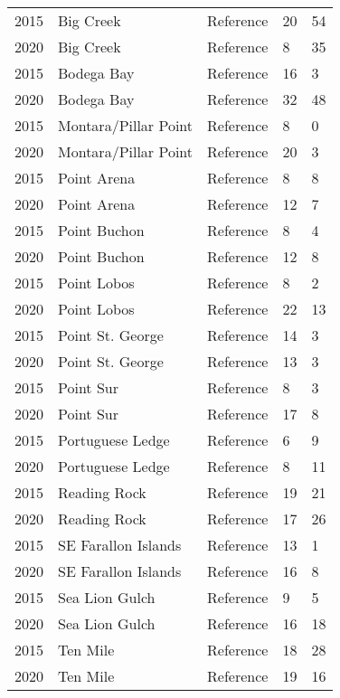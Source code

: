 \documentclass[11pt,
  english,
  letterpaper,
]{article}
\begin{document}
\begin{longtable}[t]{l>{\raggedright\arraybackslash}p{3cm}lll}
2015 & Big Creek & Reference & 20 & 54\\
2020 & Big Creek & Reference & 8 & 35\\
2015 & Bodega Bay & Reference & 16 & 3\\
2020 & Bodega Bay & Reference & 32 & 48\\
2015 & Montara/Pillar Point & Reference & 8 & 0\\
2020 & Montara/Pillar Point & Reference & 20 & 3\\
2015 & Point Arena & Reference & 8 & 8\\
2020 & Point Arena & Reference & 12 & 7\\
2015 & Point Buchon & Reference & 8 & 4\\
2020 & Point Buchon & Reference & 12 & 8\\
2015 & Point Lobos & Reference & 8 & 2\\
2020 & Point Lobos & Reference & 22 & 13\\
2015 & Point St. George & Reference & 14 & 3\\
2020 & Point St. George & Reference & 13 & 3\\
2015 & Point Sur & Reference & 8 & 3\\
2020 & Point Sur & Reference & 17 & 8\\
2015 & Portuguese Ledge & Reference & 6 & 9\\
2020 & Portuguese Ledge & Reference & 8 & 11\\
2015 & Reading Rock & Reference & 19 & 21\\
2020 & Reading Rock & Reference & 17 & 26\\
2015 & SE Farallon Islands & Reference & 13 & 1\\
2020 & SE Farallon Islands & Reference & 16 & 8\\
2015 & Sea Lion Gulch & Reference & 9 & 5\\
2020 & Sea Lion Gulch & Reference & 16 & 18\\
2015 & Ten Mile & Reference & 18 & 28\\
2020 & Ten Mile & Reference & 19 & 16\\*
\end{longtable}
\endgroup{}
\endgroup{}

\newpage

\begingroup\fontsize{7}{9}\selectfont
\end{document}
